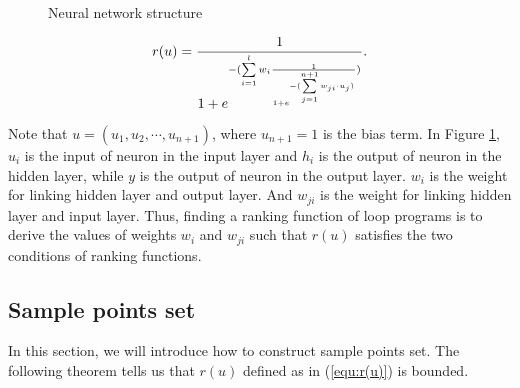 \begin{figure}
	\caption{Neural network structure}
	\label{neural structure}      %
\end{figure}
\begin{equation}\label{equ:r(u)}
r(u) = \frac{1}{{1 + {e^{ - (\sum\limits_{i = 1}^l {{w_i}\frac{1}{{1 + {e^{ - (\sum\limits_{j = 1}^{n{\rm{ + 1}}} {{w_{ji}}\cdot{u_j}} )}}}}} )}}}}.
\end{equation}

Note that $u = ({u_1},{u_2}, \cdots ,{u_{n + 1}})$, where ${u_{n + 1}} = 1$ is the bias term. In Figure \ref{neural structure}, $u_i$ is the input of neuron in the input layer and $h_i$ is the output of neuron in the hidden layer, while $y$ is the output of neuron in the output layer. ${w_i}$ is the weight for linking hidden layer and output layer. And ${w_{ji}}$ is the weight for linking hidden layer and input layer. Thus, finding a ranking function of loop programs is to derive the values of weights $w_i$ and $w_{ji}$ such that $r(u)$ satisfies the two conditions of ranking functions.
\subsection{Sample points set}
\label{Sample points set}
In this section, we will introduce how to construct sample points set. The following theorem tells us that $r(u)$ defined as in (\ref{equ:r(u)}) is bounded.

